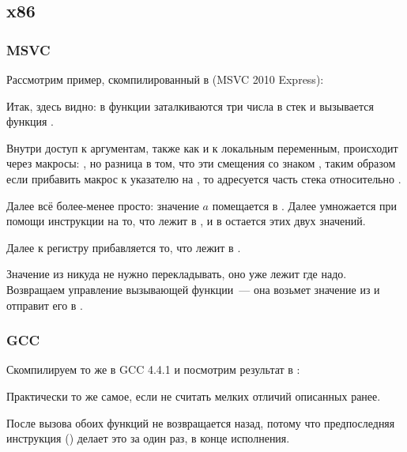 \subsection{x86}

\subsubsection{MSVC}

Рассмотрим пример, скомпилированный в (MSVC 2010 Express):



Итак, здесь видно: в функции \main заталкиваются три числа в стек и вызывается функция .
 
Внутри \ttf доступ к аргументам, также как и к локальным переменным, происходит через макросы: 
, но разница в том, что эти смещения со знаком , 
таким образом если прибавить макрос  к указателю на \EBP, то адресуется  
часть  стека относительно \EBP.

Далее всё более-менее просто: значение $a$ помещается в \EAX. 
Далее \EAX умножается при помощи инструкции \IMUL на то, что лежит в , 
и в \EAX остается  этих двух значений.

Далее к регистру \EAX прибавляется то, что лежит в .

Значение из \EAX никуда не нужно перекладывать, оно уже лежит где надо. 
Возвращаем управление вызывающей функции~--- она возьмет значение из \EAX и отправит его в \printf.



\subsubsection{GCC}

Скомпилируем то же в GCC 4.4.1 и посмотрим результат в \IDA:



Практически то же самое, если не считать мелких отличий описанных ранее.

После вызова обоих функций  не возвращается назад, 
потому что предпоследняя инструкция  () делает это за один раз, в конце исполнения.

